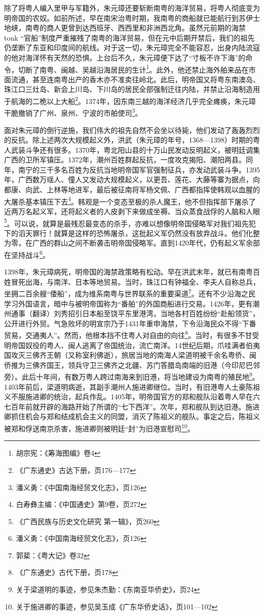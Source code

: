 除了将粤人编入里甲与军籍外，朱元璋还要斩断南粤的海洋贸易，将粤人彻底变为明帝国的农奴。如前所述，早在南宋治粤时期，我南粤的商船就已能航行到苏伊士地峡，南粤的商人更曾到达西班牙、西西里和非洲西北角。虽然元前期的海禁 tonk “官船”制度严重摧残了南粤的海洋贸易，但在元中后期开禁后，我们的祖先仍垄断了东亚和印度间的航线。对于这一切，朱元璋完全不能容忍，出身内陆流寇的他对海洋怀有天然的恐惧。上台后不久，朱元璋便下达了“寸板不许下海”的命令，切断了南粤、闽越、吴越沿海居民的生计\footnote{胡宗宪：《筹海图编》卷4}。此外，他还禁止海外舶来品在市面流通，甚至连南粤出产的香木亦不准卖往岭北。此后，明帝国又将粤东南澳岛、珠江口三灶岛、新会上川岛、下川岛的居民全部强制迁往内陆，并禁止沿海制造用于航海的二桅以上大船\footnote{《广东通史》古达下册，页176—177}。1374年，因东南三越的海洋经济几乎完全瘫痪，朱元璋干脆撤销了广州、泉州、宁波的市舶使司\footnote{潘义勇：《中国南海经贸文化志》，页126}。 

面对朱元璋的倒行逆施，我们伟大的祖先自然不会坐以待毙，他们发动了轰轰烈烈的反抗。除上述两次大规模起义外，洪武（朱元璋的年号，1368—1398）时期的粤人武装斗争还有很多。1370年，粤北阳山县的十万山民发动反明起义，被明廷调集广西的卫所军镇压。1372年，潮州百姓群起反抗，一度攻克揭阳、潮阳两县。同年，南宁的三千多名百姓为反抗当地明帝国军官强制征兵，亦发动武装斗争。1395年，广西数万瑶人、僮人又发动大规模起义，以更吾、莲花、大藤等寨为据点，向都康、向武、上林等地进军，最后被征南将军杨文佩、广西都指挥使韩观以血腥的大屠杀基本镇压下去\footnote{白寿彝主编：《中国通史》第9卷，页272}。韩观是一个变态至极的杀人魔王，他不但指挥部下屠杀了近两万名起义军，还将起义者的人皮剥下来做成坐褥、当众蒸食战俘的人脑和人眼\footnote{《广西民族与历史文化研究 第一辑》，页260}。可以说，就算是最残忍最变态的杀手，亦难以想像明帝国侵略军对我们祖先犯下的滔天罪行！就算是这样的恐怖屠杀，这批起义军仍然没有放弃战斗。他们化整为零，在广西的群山之间不断袭击明帝国侵略军。直到1420年代，仍有起义军余部在坚持战斗\footnote{潘义勇：《中国南海经贸文化志》，页126}。

1398年，朱元璋病死，明帝国的海禁政策略有松动。早在洪武末年，就已有南粤百姓冒死出海，与南洋、日本等地贸易。当时，珠江口有钟福全、李夫人自称总兵，坐拥二百余艘“倭船”，成为维系南粤与世界联系的重要渠道\footnote{郭棐：《粤大记》卷32}。还有不少沿海之民学习外国语言，暗中与被明帝国称为“番舶”的外国商船进行交易。1426年，更有潮州通事（翻译）刘秀招引日本船至饶平东里港湾，当地各村百姓纷纷“赴船领货”，公开进行外贸。气急败坏的明宣宗乃于1431年重申海禁，下令沿海民众不得“下番贸易，交通夷人”。然而，他根本挡不住粤人对自由的向往\footnote{《广东通史》古代下册，页178}。当时，有很多不甘受明帝国奴役的粤人、闽人逃离了帝国统治，流亡南洋。14世纪后期，爪哇满者伯夷国攻灭三佛齐王朝（又称室利佛逝），旅居当地的南海人梁道明被千余名粤侨、闽侨推为三佛齐国王，领兵守卫三佛齐之北疆、苏门答腊岛南端的旧港（今印尼巴邻旁）。此后十年间，有数万粤人跨过南海来到旧港，将当地建设为南粤的殖民地\footnote{关于梁道明的事迹，参见朱杰勤：《东南亚华侨史》，页24}。1403年前后，梁道明病逝，其副手潮州人施进卿继位。当时，有旧港粤人土豪陈祖义不服施进卿的统治，起兵作乱。1405年，明帝国官方的郑和舰队沿着粤人早在六七百年前就开辟的海路开始了所谓的“七下西洋”。次年，郑和舰队到达旧港。施进卿抓住机会与郑和结成机会主义的同盟，消灭了陈祖义的舰队。事定之后，陈祖义被郑和俘送南京杀害，施进卿则被明廷“封”为旧港宣慰司\footnote{关于施进卿的事迹，参见吴玉成《广东华侨史话》，页101—102}。

